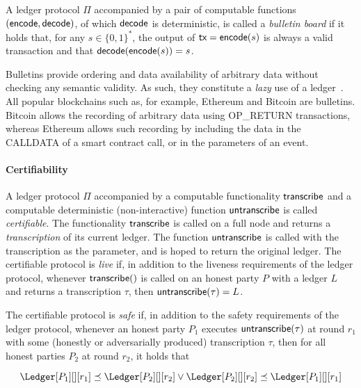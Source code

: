 \begin{definition}
  A ledger protocol $\Pi$ accompanied by a pair of computable
  functions $(\textsf{encode}, \textsf{decode})$, of which $\textsf{decode}$ is deterministic,
  is called a \emph{bulletin board} if it holds that, for any $s \in \{0, 1\}^*$,
  the output of $\textsf{tx} = \textsf{encode}(s)$ is always a valid
  transaction and that $\textsf{decode}(\textsf{encode}(s)) = s$.
\end{definition}

Bulletins provide ordering and data availability of arbitrary data without checking
any semantic validity. As such, they constitute a \emph{lazy} use of a ledger~\cite{lazyledger,lazylight}.
All popular blockchains such as, for example, Ethereum and Bitcoin are bulletins.
Bitcoin allows the recording of arbitrary data using \textsf{OP\_RETURN}
transactions, whereas Ethereum allows such recording by including the
data in the \textsf{CALLDATA} of a smart contract call, or in the parameters
of an event.

\paragraph{Certifiability}

\begin{definition}[Certifiability]
  A ledger protocol $\Pi$ accompanied by a computable functionality $\textsf{transcribe}$
  and a computable deterministic (non-interactive) function $\textsf{untranscribe}$ is called
  \emph{certifiable}. The functionality $\textsf{transcribe}$ is called on a full node
  and returns a \emph{transcription} of its current ledger. The function
  $\textsf{untranscribe}$ is called with the transcription as the parameter,
  and is hoped to return the original ledger.
  The certifiable protocol is \emph{live}
  if, in addition to the liveness requirements of the ledger protocol,
  whenever $\textsf{transcribe}()$ is called on an honest
  party $P$ with a ledger $L$ and returns a transcription $\tau$,
  then $\textsf{untranscribe}(\tau) = L$.

  The certifiable protocol is \emph{safe}
  if,
  in addition to the safety requirements of the ledger protocol,
  whenever an honest party $P_1$ executes $\textsf{untranscribe}(\tau)$ at round $r_1$
  with some (honestly or adversarially produced) transcription $\tau$,
  then for all honest parties $P_2$ at round $r_2$, it holds that

  \[
    \Ledger[P_1][][r_1] \preceq \Ledger[P_2][][r_2] \lor
    \Ledger[P_2][][r_2] \preceq \Ledger[P_1][][r_1]
  \]
\end{definition}

